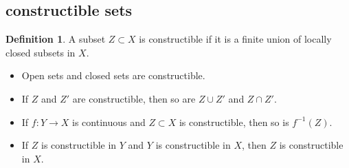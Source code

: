 \documentclass[leqno]{amsart}
\newcommand{\1}{\mathbf{1}}
\theoremstyle{definition}
\newtheorem{defn}[thm]{Definition}
\theoremstyle{remark}
\begin{document}
\subsection{constructible sets}

\begin{defn}
	A subset $Z\subset X$ is constructible 
	if it is a finite union of locally closed subsets in  $X$.
\end{defn}
\begin{itemize}
	\item Open sets and closed sets are constructible.
	\item If $Z$ and  $Z'$ are constructible,
		then so are  $Z\cup Z'$ and  $Z\cap Z'$.
	\item If  $f\colon Y\to X$ is continuous and  
		$Z\subset X$ is constructible, then so is $f^{-1}(Z)$.
	\item If  $Z$ is constructible in  $Y$ and 
		$Y$ is constructible in  $X$, 
		then $Z$ is constructible in  $X$.
\end{itemize}
\end{document}
